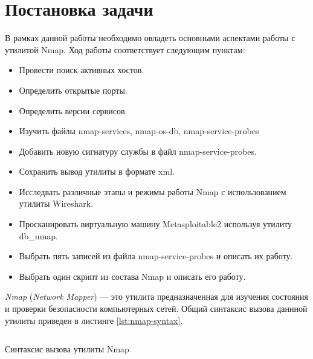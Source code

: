 \section{Постановка задачи}

В рамках данной работы необходимо овладеть основными аспектами работы с утилитой Nmap. Ход работы соответствует следующим пунктам:
\begin{itemize}
    \item Провести поиск активных хостов.
    \item Определить открытые порты.
    \item Определить версии сервисов.
    \item Изучить файлы nmap-services, nmap-os-db, nmap-service-probes
    \item Добавить новую сигнатуру службы в файл nmap-service-probes.
    \item Сохранить вывод утилиты в формате xml.
    \item Исследвать различные этапы и режимы работы Nmap с использованием утилиты Wireshark.
    \item Просканировать виртуальную машину Metasploitable2 используя утилиту db\_nmap.
    \item Выбрать пять записей из файла nmap-service-probes и описать их работу.
    \item Выбрать один скрипт из состава Nmap и описать его работу.
\end{itemize}
\emph{Nmap} (\emph{Network Mapper}) --- это утилита предназначенная для изучения состояния и проверки безопасности компьютерных сетей. 
Общий синтаксис вызова даннной утилиты приведен в листинге \ref{lst:nmap-syntax}.

\begin{listing}[H]
    \inputminted{console}{resources/00_nmap_syntax}
    \caption{Синтаксис вызова утилиты Nmap}
    \label{lst:nmap-syntax}
\end{listing}